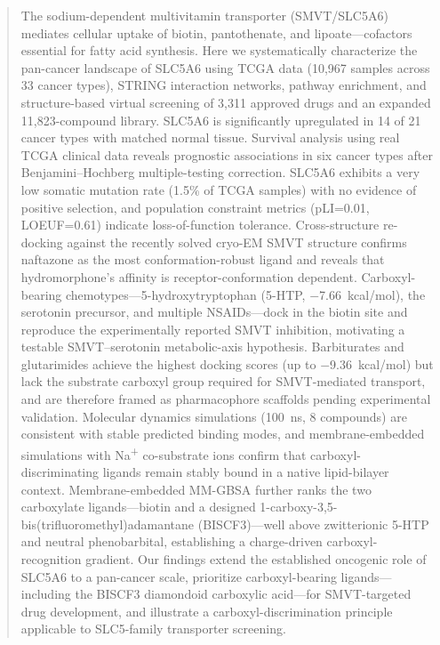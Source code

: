 \documentclass[10pt,letterpaper]{article}
\begin{document}
\begin{abstract}
The sodium-dependent multivitamin transporter (SMVT/SLC5A6) mediates cellular uptake of biotin, pantothenate, and lipoate---cofactors essential for fatty acid synthesis. Here we systematically characterize the pan-cancer landscape of SLC5A6 using TCGA data (10,967 samples across 33 cancer types), STRING interaction networks, pathway enrichment, and structure-based virtual screening of 3,311 approved drugs and an expanded 11,823-compound library. SLC5A6 is significantly upregulated in 14 of 21 cancer types with matched normal tissue. Survival analysis using real TCGA clinical data reveals prognostic associations in six cancer types after Benjamini--Hochberg multiple-testing correction. SLC5A6 exhibits a very low somatic mutation rate (1.5\% of TCGA samples) with no evidence of positive selection, and population constraint metrics (pLI=0.01, LOEUF=0.61) indicate loss-of-function tolerance. Cross-structure re-docking against the recently solved cryo-EM SMVT structure confirms naftazone as the most conformation-robust ligand and reveals that hydromorphone's affinity is receptor-conformation dependent. Carboxyl-bearing chemotypes---5-hydroxytryptophan (5-HTP, $-$7.66~kcal/mol), the serotonin precursor, and multiple NSAIDs---dock in the biotin site and reproduce the experimentally reported SMVT inhibition, motivating a testable SMVT--serotonin metabolic-axis hypothesis. Barbiturates and glutarimides achieve the highest docking scores (up to $-$9.36~kcal/mol) but lack the substrate carboxyl group required for SMVT-mediated transport, and are therefore framed as pharmacophore scaffolds pending experimental validation. Molecular dynamics simulations (100~ns, 8 compounds) are consistent with stable predicted binding modes, and membrane-embedded simulations with Na\textsuperscript{+} co-substrate ions confirm that carboxyl-discriminating ligands remain stably bound in a native lipid-bilayer context. Membrane-embedded MM-GBSA further ranks the two carboxylate ligands---biotin and a designed 1-carboxy-3,5-bis(trifluoromethyl)adamantane (BISCF3)---well above zwitterionic 5-HTP and neutral phenobarbital, establishing a charge-driven carboxyl-recognition gradient. Our findings extend the established oncogenic role of SLC5A6 to a pan-cancer scale, prioritize carboxyl-bearing ligands---including the BISCF3 diamondoid carboxylic acid---for SMVT-targeted drug development, and illustrate a carboxyl-discrimination principle applicable to SLC5-family transporter screening.
\end{abstract}
\end{document}
